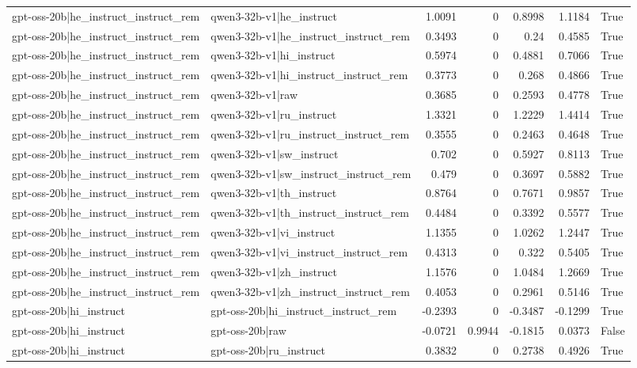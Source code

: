 \begin{table}
\begin{tabular}{l l r r r r l}
gpt-oss-20b|he_instruct_instruct_rem & qwen3-32b-v1|he_instruct & 1.0091 & 0 & 0.8998 & 1.1184 & True \\
gpt-oss-20b|he_instruct_instruct_rem & qwen3-32b-v1|he_instruct_instruct_rem & 0.3493 & 0 & 0.24 & 0.4585 & True \\
gpt-oss-20b|he_instruct_instruct_rem & qwen3-32b-v1|hi_instruct & 0.5974 & 0 & 0.4881 & 0.7066 & True \\
gpt-oss-20b|he_instruct_instruct_rem & qwen3-32b-v1|hi_instruct_instruct_rem & 0.3773 & 0 & 0.268 & 0.4866 & True \\
gpt-oss-20b|he_instruct_instruct_rem & qwen3-32b-v1|raw & 0.3685 & 0 & 0.2593 & 0.4778 & True \\
gpt-oss-20b|he_instruct_instruct_rem & qwen3-32b-v1|ru_instruct & 1.3321 & 0 & 1.2229 & 1.4414 & True \\
gpt-oss-20b|he_instruct_instruct_rem & qwen3-32b-v1|ru_instruct_instruct_rem & 0.3555 & 0 & 0.2463 & 0.4648 & True \\
gpt-oss-20b|he_instruct_instruct_rem & qwen3-32b-v1|sw_instruct & 0.702 & 0 & 0.5927 & 0.8113 & True \\
gpt-oss-20b|he_instruct_instruct_rem & qwen3-32b-v1|sw_instruct_instruct_rem & 0.479 & 0 & 0.3697 & 0.5882 & True \\
gpt-oss-20b|he_instruct_instruct_rem & qwen3-32b-v1|th_instruct & 0.8764 & 0 & 0.7671 & 0.9857 & True \\
gpt-oss-20b|he_instruct_instruct_rem & qwen3-32b-v1|th_instruct_instruct_rem & 0.4484 & 0 & 0.3392 & 0.5577 & True \\
gpt-oss-20b|he_instruct_instruct_rem & qwen3-32b-v1|vi_instruct & 1.1355 & 0 & 1.0262 & 1.2447 & True \\
gpt-oss-20b|he_instruct_instruct_rem & qwen3-32b-v1|vi_instruct_instruct_rem & 0.4313 & 0 & 0.322 & 0.5405 & True \\
gpt-oss-20b|he_instruct_instruct_rem & qwen3-32b-v1|zh_instruct & 1.1576 & 0 & 1.0484 & 1.2669 & True \\
gpt-oss-20b|he_instruct_instruct_rem & qwen3-32b-v1|zh_instruct_instruct_rem & 0.4053 & 0 & 0.2961 & 0.5146 & True \\
gpt-oss-20b|hi_instruct & gpt-oss-20b|hi_instruct_instruct_rem & -0.2393 & 0 & -0.3487 & -0.1299 & True \\
gpt-oss-20b|hi_instruct & gpt-oss-20b|raw & -0.0721 & 0.9944 & -0.1815 & 0.0373 & False \\
gpt-oss-20b|hi_instruct & gpt-oss-20b|ru_instruct & 0.3832 & 0 & 0.2738 & 0.4926 & True \\

\end{tabular}
\end{table}
